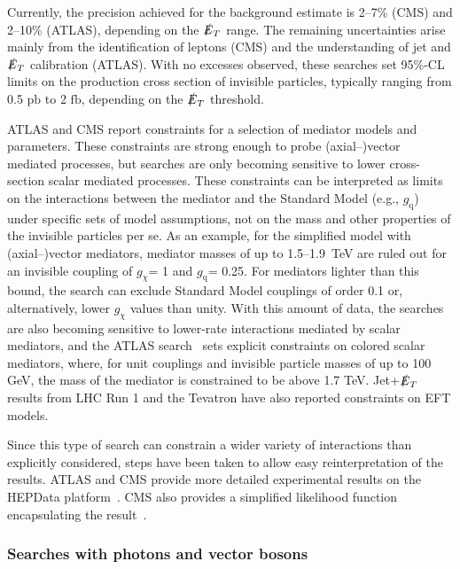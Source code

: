 \documentclass{ar-1col}
\newcommand{\chiDM}{\ensuremath{\chi}\xspace}
\newcommand{\IP}{invisible particle}
\newcommand{\gDM}{\ensuremath{g_{\chiDM}}\xspace}
\newcommand{\gdm}{\gDM}
\newcommand{\gq}{$g_{\mathrm{q}}$\xspace}
\newcommand{\MET}{\ensuremath{\slashed{E}_T}\xspace}
\newcommand{\fb}{\ensuremath{\mathrm{fb}}\xspace}
\newcommand{\pb}{\ensuremath{\mathrm{pb}}\xspace}
\begin{document}
{Currently, the precision achieved for the background estimate is 2--7\%
(CMS) and 2--10\% (ATLAS), depending on the \MET range. The
remaining uncertainties arise mainly from the identification of
leptons (CMS) and the understanding of jet and \MET
calibration (ATLAS).
With no excesses observed, these searches set 95\%-CL limits
on the production cross section of {\IP}s, typically ranging from
0.5 \pb to 2 \fb, depending on the \MET threshold. 

ATLAS and CMS report
constraints for a selection of mediator models and parameters. These constraints are strong enough to probe (axial--)vector mediated
processes, but searches are only becoming sensitive to lower cross-section scalar mediated processes. 
 These constraints
can be interpreted as limits on the interactions between the
mediator and the Standard Model (e.g., \gq) under specific sets of model
assumptions, not on the mass and other properties of the {\IP}s
per se. As an example, for the simplified model with
(axial--)vector mediators, mediator masses of up to
1.5--1.9~TeV are ruled out
for an invisible coupling of \gdm = 1 and \gq = 0.25. For mediators lighter than
this bound, the search can exclude Standard Model couplings of order 0.1 or,
alternatively, lower \gdm values than unity. With this amount of
data, the searches are also becoming sensitive to lower-rate
interactions mediated by scalar mediators, and the
ATLAS search~\cite{Aaboud:2017phn} sets explicit constraints on
colored scalar mediators, where, for unit couplings and invisible
particle masses of up to 100 GeV, the mass of the mediator is
constrained to be above 1.7 TeV. Jet+\MET results from LHC Run 1
and the Tevatron have also reported constraints on EFT models.

Since this type of search can constrain a wider variety of
interactions than explicitly considered, steps have been taken to
allow easy reinterpretation of the results. ATLAS and CMS provide
more detailed experimental results on the HEPData
platform~\cite{Maguire:2017ypu}. CMS also provides a simplified
likelihood function encapsulating the
result~\cite{Collaboration:2242860,Sirunyan:2017jix}.

\subsubsection{Searches with photons and vector bosons}\label{subsub:monoV}

}
\end{document}

